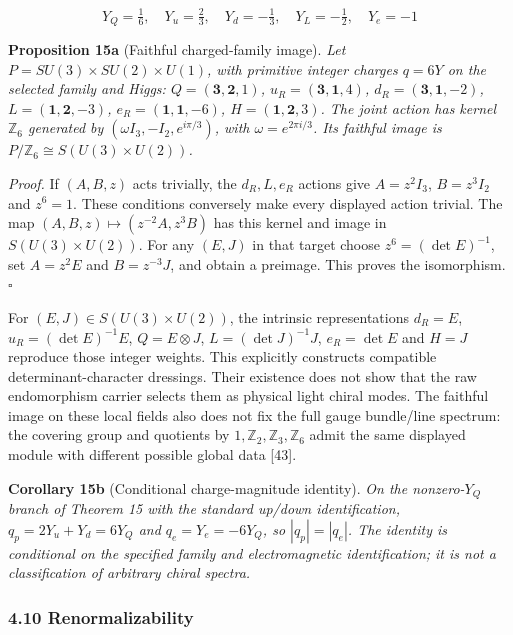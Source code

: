 \documentclass[
]{article}
\begin{document}
\[Y_Q = \tfrac{1}{6}, \quad Y_u = \tfrac{2}{3}, \quad Y_d = -\tfrac{1}{3}, \quad Y_L = -\tfrac{1}{2}, \quad Y_e = -1\]

\textbf{Proposition 15a} (Faithful charged-family image). \emph{Let
\(P=SU(3)\times SU(2)\times U(1)\), with primitive integer charges
\(q=6Y\) on the selected family and Higgs: \(Q=(\mathbf3,\mathbf2,1)\),
\(u_R=(\mathbf3,\mathbf1,4)\), \(d_R=(\mathbf3,\mathbf1,-2)\),
\(L=(\mathbf1,\mathbf2,-3)\), \(e_R=(\mathbf1,\mathbf1,-6)\),
\(H=(\mathbf1,\mathbf2,3)\). The joint action has kernel \(\mathbb Z_6\)
generated by \((\omega I_3,-I_2,e^{i\pi/3})\), with
\(\omega=e^{2\pi i/3}\). Its faithful image is
\(P/\mathbb Z_6\cong S(U(3)\times U(2))\).}

\emph{Proof.} If \((A,B,z)\) acts trivially, the \(d_R,L,e_R\) actions
give \(A=z^2I_3\), \(B=z^3I_2\) and \(z^6=1\). These conditions
conversely make every displayed action trivial. The map
\((A,B,z)\mapsto(z^{-2}A,z^3B)\) has this kernel and image in
\(S(U(3)\times U(2))\). For any \((E,J)\) in that target choose
\(z^6=(\det E)^{-1}\), set \(A=z^2E\) and \(B=z^{-3}J\), and obtain a
preimage. This proves the isomorphism. \(\square\)

For \((E,J)\in S(U(3)\times U(2))\), the intrinsic representations
\(d_R=E\), \(u_R=(\det E)^{-1}E\), \(Q=E\otimes J\),
\(L=(\det J)^{-1}J\), \(e_R=\det E\) and \(H=J\) reproduce those integer
weights. This explicitly constructs compatible determinant-character
dressings. Their existence does not show that the raw endomorphism
carrier selects them as physical light chiral modes. The faithful image
on these local fields also does not fix the full gauge bundle/line
spectrum: the covering group and quotients by
\(1,\mathbb Z_2,\mathbb Z_3,\mathbb Z_6\) admit the same displayed
module with different possible global data {[}43{]}.

\textbf{Corollary 15b} (Conditional charge-magnitude identity). \emph{On
the nonzero-\(Y_Q\) branch of Theorem 15 with the standard up/down
identification, \(q_p=2Y_u+Y_d=6Y_Q\) and \(q_e=Y_e=-6Y_Q\), so
\(|q_p|=|q_e|\). The identity is conditional on the specified family and
electromagnetic identification; it is not a classification of arbitrary
chiral spectra.}

\hypertarget{renormalizability}{%
\subsubsection{4.10 Renormalizability}\label{renormalizability}}
\end{document}

